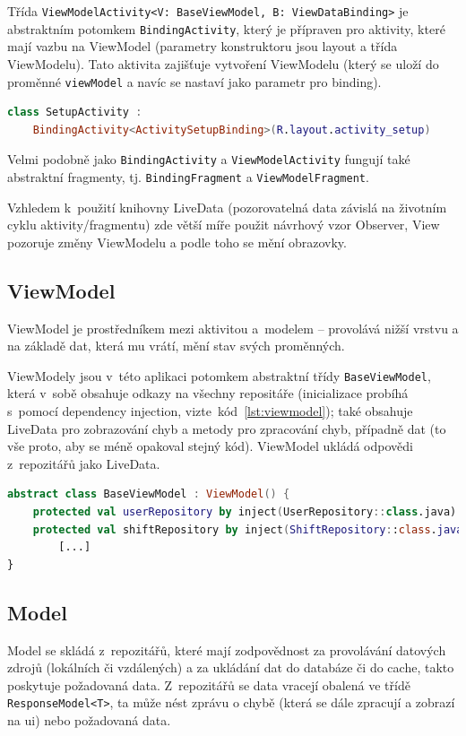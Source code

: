 \documentclass[a4paper,11pt,openany,twoside]{book}
\begin{document}
Třída \texttt{ViewModelActivity<V: BaseViewModel, B:  ViewDataBinding>} je abstraktním potomkem \texttt{BindingActivity}, který je přípraven pro aktivity, které mají vazbu na ViewModel (parametry konstruktoru jsou layout a třída ViewModelu). Tato aktivita zajišťuje vytvoření ViewModelu (který se uloží do proměnné \texttt{viewModel} a navíc se nastaví jako parametr pro binding).

\begin{lstlisting}[language=Kotlin,caption={Vytvoření jednoduché aktivity},label={lst:newactivity}]
class SetupActivity :
	BindingActivity<ActivitySetupBinding>(R.layout.activity_setup)
\end{lstlisting}

Velmi podobně jako \texttt{BindingActivity} a \texttt{ViewModelActivity} fungují také abstraktní fragmenty, tj. \texttt{BindingFragment} a \texttt{ViewModelFragment}.

Vzhledem k~použití knihovny LiveData (pozorovatelná data závislá na životním cyklu aktivity/fragmentu) zde větší míře použit návrhový vzor Observer, View pozoruje změny ViewModelu a podle toho se mění obrazovky.

\subsection{ViewModel}

ViewModel je prostředníkem mezi aktivitou a~modelem -- provolává nižší vrstvu a na základě dat, která mu vrátí, mění stav svých proměnných.

ViewModely jsou v~této aplikaci potomkem abstraktní třídy \texttt{BaseViewModel}, která v~sobě obsahuje odkazy na všechny repositáře (inicializace probíhá s~pomocí dependency injection, vizte~kód~\ref{lst:viewmodel}); také obsahuje LiveData pro zobrazování chyb a metody pro zpracování chyb, případně dat (to vše proto, aby se méně opakoval stejný kód). ViewModel ukládá odpovědi z~repozitářů jako LiveData.

\begin{lstlisting}[language=Kotlin,caption={Třída \texttt{BaseViewModel}},label={lst:viewmodel}]
abstract class BaseViewModel : ViewModel() {
    protected val userRepository by inject(UserRepository::class.java)
    protected val shiftRepository by inject(ShiftRepository::class.java)
		[...]
}
\end{lstlisting}

\subsection{Model}
Model se skládá z~repozitářů, které mají zodpovědnost za provolávání datových zdrojů (lokálních či vzdálených) a za ukládání dat do databáze či do cache, takto poskytuje požadovaná data. Z~repozitářů se data vracejí obalená ve třídě \texttt{ResponseModel<T>}, ta může nést zprávu o chybě (která se dále zpracují a zobrazí na \acs{ui}) nebo požadovaná data.
\end{document}
